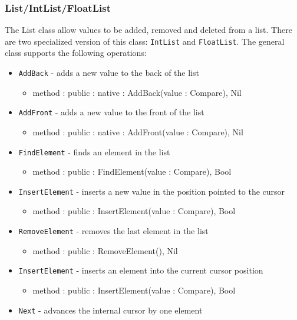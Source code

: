 \documentclass[12pt]{article}
\begin{document}
\subsubsection{List/IntList/FloatList}
The List class allow values to be added, removed and deleted from a list.  There are two specialized version of this class: \texttt{IntList} and \texttt{FloatList}.  The general class supports the following operations:
\begin{itemize}
    \item \texttt{AddBack} - adds a new value to the back of the list
    	\begin{itemize}
	\item method : public : native : AddBack(value : Compare), Nil
	\end{itemize}
    \item \texttt{AddFront} - adds a new value to the front of the list
    	\begin{itemize}
	\item method : public : native : AddFront(value : Compare), Nil
	\end{itemize}
    \item \texttt{FindElement} - finds an element in the list
    	\begin{itemize}
	\item method : public : FindElement(value : Compare), Bool
	\end{itemize}
    \item \texttt{InsertElement} - inserts a new value in the position pointed to the cursor
    	\begin{itemize}
	\item method : public : InsertElement(value : Compare), Bool
	\end{itemize}
    \item \texttt{RemoveElement} - removes the last element in the list
    	\begin{itemize}
	\item method : public : RemoveElement(), Nil
	\end{itemize}
    \item \texttt{InsertElement} - inserts an element into the current cursor position
    	\begin{itemize}
	\item method : public : InsertElement(value : Compare), Bool
	\end{itemize}	
    \item \texttt{Next} - advances the internal cursor by one element
    	\begin{itemize}

\end{itemize}
\end{itemize}
\end{document}

